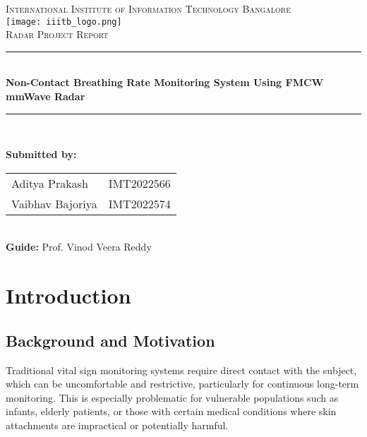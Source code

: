 \documentclass[12pt]{article}
\begin{document}
\begin{titlepage}

\newcommand{\HRule}{\rule{\linewidth}{0.5mm}}

\centering

\textsc{\LARGE International Institute of Information Technology Bangalore}\\[1.5cm]

\texttt{[image: iiitb\_logo.png]}\\[1cm]

\textsc{\Large Radar Project Report}\\[0.5cm]

\HRule \\[0.5cm]
{\huge \bfseries Non-Contact Breathing Rate Monitoring System Using FMCW mmWave Radar}\\[0.5cm]
\HRule \\[1cm]

\begin{flushleft}
\large
\textbf{Submitted by:}\\[0.4cm]
\begin{tabular}{@{}p{6.5cm} l}
Aditya Prakash & \textsc{IMT2022566} \\
Vaibhav Bajoriya & \textsc{IMT2022574} \\
\end{tabular}\\[0.5cm]

\textbf{Guide:} Prof. Vinod Veera Reddy
\end{flushleft}



\end{titlepage}

\tableofcontents
\newpage

\section{Introduction}

\subsection{Background and Motivation}
Traditional vital sign monitoring systems require direct contact with the subject, which can be uncomfortable and restrictive, particularly for continuous long-term monitoring. This is especially problematic for vulnerable populations such as infants, elderly patients, or those with certain medical conditions where skin attachments are impractical or potentially harmful.
\end{document}
